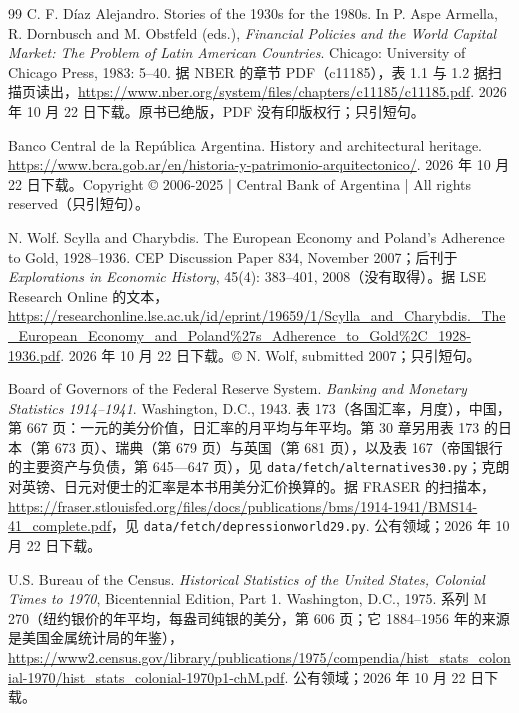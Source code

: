\begin{thebibliography}{99}
 C. F. Díaz Alejandro. Stories of the 1930s for the 1980s. In P. Aspe Armella, R. Dornbusch and M. Obstfeld (eds.), \emph{Financial Policies and the World Capital Market: The Problem of Latin American Countries}. Chicago: University of Chicago Press, 1983: 5--40. 据 NBER 的章节 PDF（c11185），表 1.1 与 1.2 据扫描页读出，\url{https://www.nber.org/system/files/chapters/c11185/c11185.pdf}. 2026 年 10 月 22 日下载。原书已绝版，PDF 没有印版权行；只引短句。

 Banco Central de la República Argentina. History and architectural heritage. \url{https://www.bcra.gob.ar/en/historia-y-patrimonio-arquitectonico/}. 2026 年 10 月 22 日下载。Copyright © 2006-2025 | Central Bank of Argentina | All rights reserved（只引短句）。

 N. Wolf. Scylla and Charybdis. The European Economy and Poland's Adherence to Gold, 1928--1936. CEP Discussion Paper 834, November 2007；后刊于 \emph{Explorations in Economic History}, 45(4): 383--401, 2008（没有取得）。据 LSE Research Online 的文本，\url{https://researchonline.lse.ac.uk/id/eprint/19659/1/Scylla_and_Charybdis._The_European_Economy_and_Poland\%27s_Adherence_to_Gold\%2C_1928-1936.pdf}. 2026 年 10 月 22 日下载。© N. Wolf, submitted 2007；只引短句。

 Board of Governors of the Federal Reserve System. \emph{Banking and Monetary Statistics 1914--1941}. Washington, D.C., 1943. 表 173（各国汇率，月度），中国，第 667 页：一元的美分价值，日汇率的月平均与年平均。第 30 章另用表 173 的日本（第 673 页）、瑞典（第 679 页）与英国（第 681 页），以及表 167（帝国银行的主要资产与负债，第 645—647 页），见 \texttt{data/fetch/alternatives30.py}；克朗对英镑、日元对便士的汇率是本书用美分汇价换算的。据 FRASER 的扫描本，\url{https://fraser.stlouisfed.org/files/docs/publications/bms/1914-1941/BMS14-41_complete.pdf}，见 \texttt{data/fetch/depressionworld29.py}. 公有领域；2026 年 10 月 22 日下载。

 U.S. Bureau of the Census. \emph{Historical Statistics of the United States, Colonial Times to 1970}, Bicentennial Edition, Part 1. Washington, D.C., 1975. 系列 M 270（纽约银价的年平均，每盎司纯银的美分，第 606 页；它 1884--1956 年的来源是美国金属统计局的年鉴），\url{https://www2.census.gov/library/publications/1975/compendia/hist_stats_colonial-1970/hist_stats_colonial-1970p1-chM.pdf}. 公有领域；2026 年 10 月 22 日下载。


\end{thebibliography}
